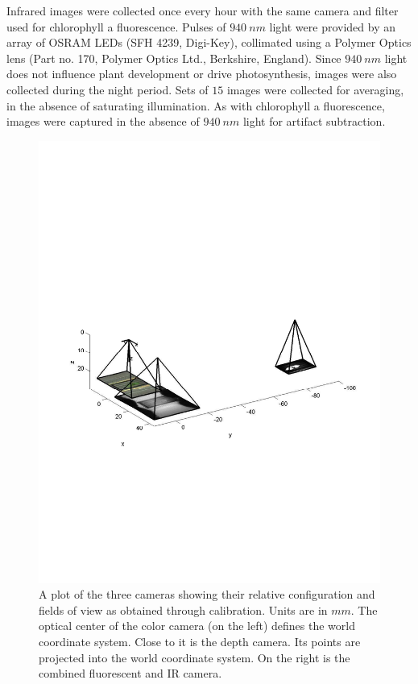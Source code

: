 Infrared images were collected once every hour with the same camera and filter used for chlorophyll a fluorescence.  
Pulses of $940~nm$ light were provided by an array of OSRAM LEDs (SFH 4239, Digi-Key), collimated using a Polymer Optics lens (Part no. 170, Polymer Optics Ltd., Berkshire, England).  
Since $940~nm$ light does not influence plant development or drive photosynthesis, images were also collected during the night period.  
Sets of $15$ images were collected for averaging, in the absence of saturating illumination.   
As with chlorophyll a fluorescence, images were captured in the absence of $940~nm$ light for artifact subtraction.

\begin{figure}
  \includegraphics[width=\linewidth,trim=50 230 45 300,clip]{Figures/CameraConfiguration}
\caption{A plot of the three cameras showing their relative configuration and fields of view as obtained through calibration.  Units are in $mm$.  The optical center of the color camera (on the left) defines the world coordinate system.  Close to it is the depth camera.  Its points are projected into the world coordinate system.  On the right is the combined fluorescent and IR camera.}
\label{fig:CameraConfiguration}
\end{figure}

